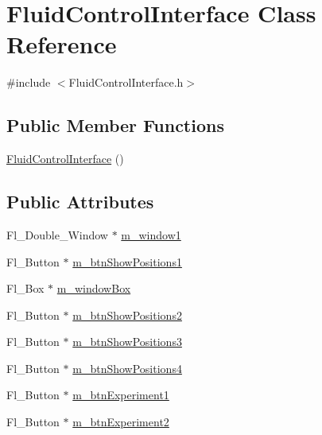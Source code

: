 \hypertarget{class_fluid_control_interface}{}\section{Fluid\+Control\+Interface Class Reference}
\label{class_fluid_control_interface}


{\ttfamily \#include $<$Fluid\+Control\+Interface.\+h$>$}

\subsection*{Public Member Functions}
\begin{DoxyCompactItemize}
\item 
\hyperlink{class_fluid_control_interface_a4cb172a43e95b2852f30807e9037a9d9}{Fluid\+Control\+Interface} ()
\end{DoxyCompactItemize}
\subsection*{Public Attributes}
\begin{DoxyCompactItemize}
\item 
Fl\+\_\+\+Double\+\_\+\+Window $\ast$ \hyperlink{class_fluid_control_interface_ab318bb377679cd76946bb68fc505652f}{m\+\_\+window1}
\item 
Fl\+\_\+\+Button $\ast$ \hyperlink{class_fluid_control_interface_aa98b7fdaecb2d588e5decc52f23919fb}{m\+\_\+btn\+Show\+Positions1}
\item 
Fl\+\_\+\+Box $\ast$ \hyperlink{class_fluid_control_interface_a04185b8fd0895dfc2b77a77c9eb61bc8}{m\+\_\+window\+Box}
\item 
Fl\+\_\+\+Button $\ast$ \hyperlink{class_fluid_control_interface_acc9ea2ec328a79737c722c6f7a3b236d}{m\+\_\+btn\+Show\+Positions2}
\item 
Fl\+\_\+\+Button $\ast$ \hyperlink{class_fluid_control_interface_acd3d58fda18fea04d02874461097c510}{m\+\_\+btn\+Show\+Positions3}
\item 
Fl\+\_\+\+Button $\ast$ \hyperlink{class_fluid_control_interface_a507c8f8707e6735a1f651e0cf9d5a51b}{m\+\_\+btn\+Show\+Positions4}
\item 
Fl\+\_\+\+Button $\ast$ \hyperlink{class_fluid_control_interface_a4d0defe9534380c28d3e83a58d909696}{m\+\_\+btn\+Experiment1}
\item 
Fl\+\_\+\+Button $\ast$ \hyperlink{class_fluid_control_interface_a3d129ab381b2bcf443836df21664d549}{m\+\_\+btn\+Experiment2}
\end{DoxyCompactItemize}


